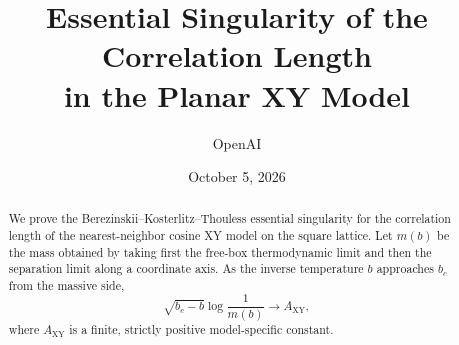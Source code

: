 \documentclass[11pt]{article}
\title{Essential Singularity of the Correlation Length\\in the Planar XY Model}
\author{OpenAI}
\date{October 5, 2026}
\numberwithin{equation}{section}
\theoremstyle{definition}
\theoremstyle{remark}
\begin{document}
\maketitle
\begin{abstract}
We prove the Berezinskii--Kosterlitz--Thouless essential singularity for the
correlation length of the nearest-neighbor cosine XY model on the square
lattice. Let \(m(b)\) be the mass obtained by taking first the free-box
thermodynamic limit and then the separation limit along a coordinate axis.
As the inverse temperature \(b\) approaches \(b_c\) from the massive side,
\[
\sqrt{b_c-b}\log\frac{1}{m(b)}
\longrightarrow A_{\mathrm{XY}},
\]
where \(A_{\mathrm{XY}}\) is a finite, strictly positive model-specific constant.
\end{abstract}







\end{document}

